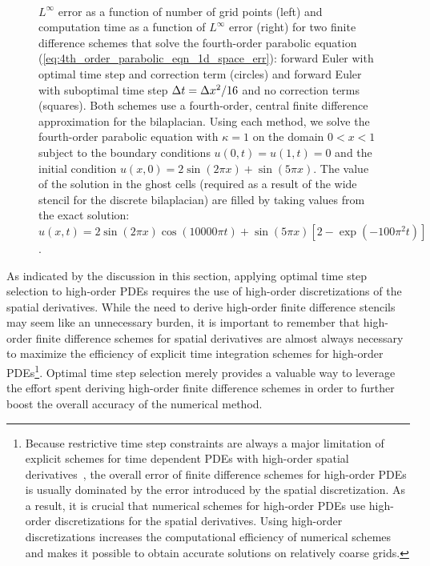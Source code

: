 \documentclass[oneeqnum,onefignum,onetabnum,onethmnum]{siamltex}
\begin{document}
\begin{figure}[tb]
\begin{center}
\ \ 
\caption{$L^\infty$ error as a function of number of grid points (left)
and computation time as a function of $L^\infty$ error (right) for two 
finite difference schemes that solve the fourth-order parabolic equation 
(\ref{eq:4th_order_parabolic_eqn_1d_space_err}):
forward Euler with optimal time step and correction term (circles)
and forward Euler with suboptimal time step $\Delta t = \Delta x^2/16$ and no 
correction terms (squares).
Both schemes use a fourth-order, central finite difference approximation for
the bilaplacian.  Using each method, we solve the fourth-order parabolic
equation with $\kappa = 1$ on the domain $0 < x < 1$ subject to the boundary 
conditions $u(0,t) = u(1,t) = 0$ and the initial condition
$u(x,0) = 2\sin(2 \pi x) + \sin(5 \pi x)$.  The value of the solution
in the ghost cells (required as a result of the wide stencil for the 
discrete bilaplacian) are filled by taking values from the exact solution: 
$u(x,t) = 2\sin(2 \pi x)\cos(10000 \pi t) 
        + \sin(5 \pi x) \left[ 2-\exp(-100\pi^2 t) \right]$.
}
\label{fig:4th_order_parabolic_eqn_1d_error}
\end{center}
\end{figure}

As indicated by the discussion in this section, applying optimal time step 
selection to high-order PDEs requires the use of high-order discretizations
of the spatial derivatives.  While the need to derive high-order finite 
difference stencils may seem like an unnecessary burden, it is important
to remember that high-order finite difference schemes for spatial derivatives
are almost always necessary to maximize the efficiency of explicit time
integration schemes for high-order PDEs\footnote{Because restrictive time 
step constraints are always a major limitation of explicit schemes for 
time dependent PDEs with high-order spatial 
derivatives~\cite{gko_book,greer_2006}, 
the overall error of finite difference schemes for high-order PDEs is usually 
dominated by the error introduced by the spatial discretization.  As a result, 
it is crucial that numerical schemes for high-order PDEs use high-order 
discretizations for the spatial derivatives.  Using high-order discretizations 
increases the computational efficiency of numerical schemes and makes it 
possible to obtain accurate solutions on relatively coarse grids.}. 
Optimal time step selection merely provides a valuable way to leverage the 
effort spent deriving high-order finite difference schemes in order to further 
boost the overall accuracy of the numerical method.
\end{document}
